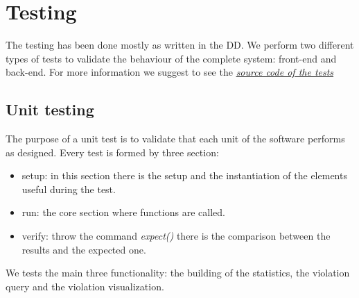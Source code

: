 \documentclass[../ITD.tex]{subfiles}
\begin{document}
    \chapter{Testing}\label{ch:testing}
    The testing has been done mostly as written in the DD. We perform two different types of tests to validate the behaviour of the complete system: front-end and back-end.
    \newline For more information we suggest to see the \href{https://github.com/fedy97/MorrealeMaddesInnocente/tree/master/safe_streets/test}{\emph{source code of the tests}}
    \section{Unit testing}\label{sec:unit-testing}
    The purpose of a unit test is to validate that each unit of the software performs as designed.
    \newline Every test is formed by three section:
    \begin{itemize}
        \item setup: in this section there is the setup and the instantiation of the elements useful during the test.
        \item run: the core section where functions are called.
        \item verify: throw the command \textit{expect()} there is the comparison between the results and the expected one.
    \end{itemize}
    We tests the main three functionality: the building of the statistics, the violation query and the violation visualization.
\end{document}
